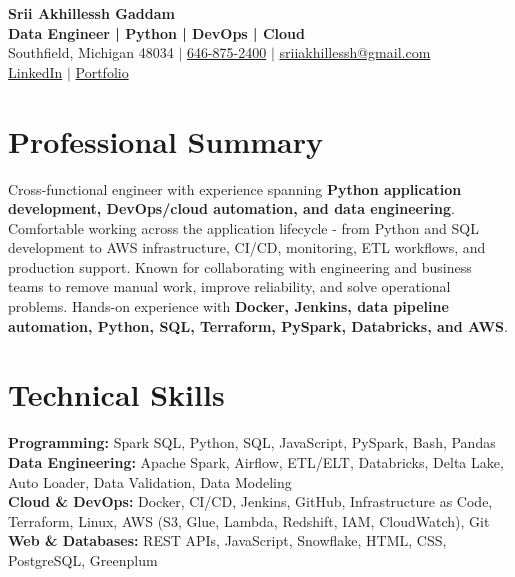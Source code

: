 \documentclass[letterpaper,10pt]{article}
\begin{document}
\fontsize{9.35pt}{10.45pt}\selectfont

\begin{center}
    {\LARGE \textbf{Srii Akhillessh Gaddam}} \\[-1pt]
    \textbf{Data Engineer | Python | DevOps | Cloud} \\[2pt]
    Southfield, Michigan 48034 $|$
    \href{tel:6468752400}{646-875-2400} $|$
    \href{mailto:sriiakhillessh@gmail.com}{sriiakhillessh@gmail.com} \\[1pt]
    \href{https://www.linkedin.com/in/srii-akhiilessh-gaddam-b48668191/}{LinkedIn} $|$
    \href{https://sriiakhillesshg.github.io/portfolio/}{Portfolio}
\end{center}
\vspace{-8pt}

\section{Professional Summary}
\small{Cross-functional engineer with experience spanning \textbf{Python application development, DevOps/cloud automation, and data engineering}. Comfortable working across the application lifecycle - from Python and SQL development to AWS infrastructure, CI/CD, monitoring, ETL workflows, and production support. Known for collaborating with engineering and business teams to remove manual work, improve reliability, and solve operational problems. Hands-on experience with \textbf{Docker, Jenkins, data pipeline automation, Python, SQL, Terraform, PySpark, Databricks, and AWS}.}

\section{Technical Skills}
\small{
\textbf{Programming:} Spark SQL, Python, SQL, JavaScript, PySpark, Bash, Pandas \\
\textbf{Data Engineering:} Apache Spark, Airflow, ETL/ELT, Databricks, Delta Lake, Auto Loader, Data Validation, Data Modeling \\
\textbf{Cloud \& DevOps:} Docker, CI/CD, Jenkins, GitHub, Infrastructure as Code, Terraform, Linux, AWS (S3, Glue, Lambda, Redshift, IAM, CloudWatch), Git \\
\textbf{Web \& Databases:} REST APIs, JavaScript, Snowflake, HTML, CSS, PostgreSQL, Greenplum
}
\end{document}
